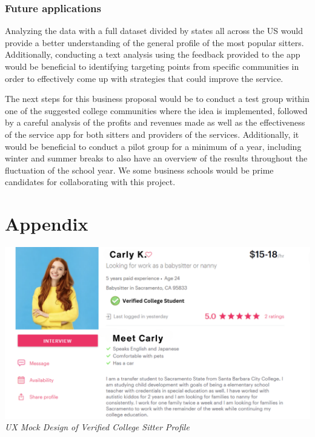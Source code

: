 \documentclass[12pt]{article}
\begin{document}
\hypertarget{future-applications}{%
\subsubsection{\texorpdfstring{\textbf{Future
applications}}{Future applications}}\label{future-applications}}

Analyzing the data with a full dataset divided by states all across the
US would provide a better understanding of the general profile of the
most popular sitters. Additionally, conducting a text analysis using the
feedback provided to the app would be beneficial to identifying
targeting points from specific communities in order to effectively come
up with strategies that could improve the service.~

The next steps for this business proposal would be to conduct a test
group within one of the suggested college communities where the idea is
implemented, followed by a careful analysis of the profits and revenues
made as well as the effectiveness of the service app for both sitters
and providers of the services. Additionally, it would be beneficial to
conduct a pilot group for a minimum of a year, including winter and
summer breaks to also have an overview of the results throughout the
fluctuation of the school year. We some business schools would be prime
candidates for collaborating with this project.

\newpage

\hypertarget{appendix}{%
\section{Appendix}\label{appendix}}

\includegraphics{IMAGES/UX3.png} \emph{UX Mock Design of Verified
College Sitter Profile}
\end{document}
